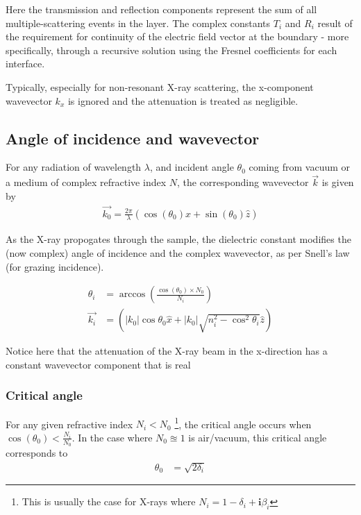 \documentclass[../main.tex]{subfiles}
\begin{document}
	Here the transmission and reflection components represent the sum of all multiple-scattering events in the layer.
	The complex constants $T_i$ and $R_i$ result of the requirement for continuity of the electric field vector at the boundary - more specifically, through a recursive solution using the Fresnel coefficients for each interface.

	Typically, especially for non-resonant X-ray scattering, the x-component wavevector $k_x$ is ignored and the attenuation is treated as negligible.

	\subsection{Angle of incidence and wavevector}
	For any radiation of wavelength $\lambda$, and incident angle $\theta_0$ coming from vacuum or a medium of complex refractive index $N$,
	the corresponding wavevector $\vec{k}$ is given by
	\begin{align}
		\vec{k_0} = \frac{2 \pi}{\lambda} \left( \cos(\theta_0) \hat{x} + \sin(\theta_0) \hat{z} \right)
	\end{align}
	
	As the X-ray propogates through the sample, the dielectric constant modifies the (now complex) angle of incidence and the complex wavevector, as per Snell's law (for grazing incidence).

	\begin{align}
		\theta_i &= \arccos\left(\frac{\cos\left(\theta_0\right) \times N_0}{N_i}\right)\\
		\vec{k_i} &= \left( |k_{0}|\cos\theta_0 \hat{x} + |k_0| \sqrt{n_i^2 - \cos^2\theta_i} \hat{z} \right)
	\end{align}	

	Notice here that the attenuation of the X-ray beam in the x-direction has a constant wavevector component that is real


	\subsubsection{Critical angle}
	For any given refractive index $N_i < N_0$ \footnote{This is usually the case for X-rays where $N_i = 1 - \delta_i + \mathbf{i}\beta_i$}, the critical angle occurs when $\cos\left(\theta_0\right) < \frac{N_i}{N_0}$.
	In the case where $N_0 \approxeq 1$ is air/vacuum, this critical angle corresponds to
	\begin{align}
		\theta_{0} &= \sqrt{2 \delta_i}
	\end{align}
\end{document}
